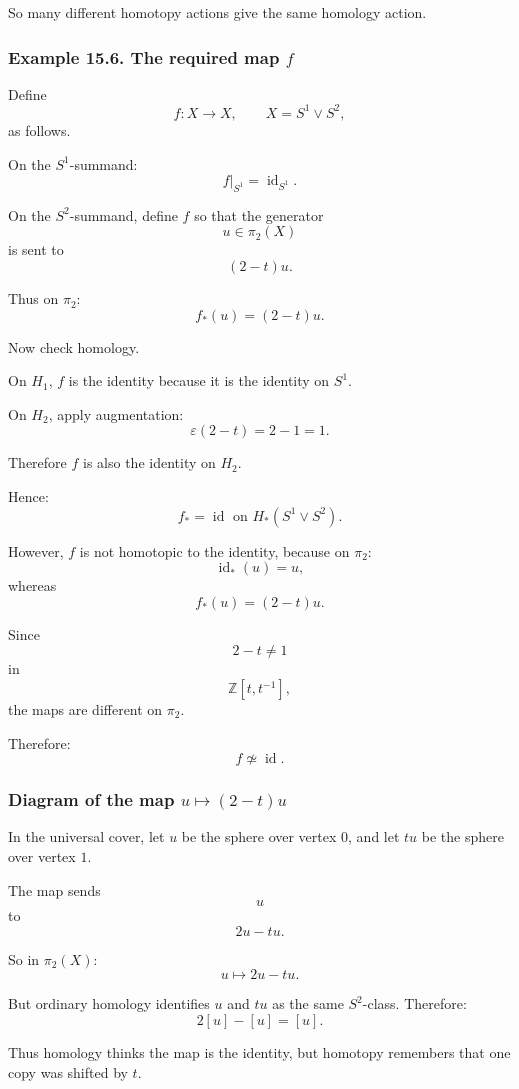 \documentclass[12pt,a4paper]{article}
\theoremstyle{notespace}
\begin{document}
So many different homotopy actions give the same homology action.

\subsubsection*{Example 15.6. The required map \(f\)}

Define
\[
f:X\to X,
\qquad
X=S^1\vee S^2,
\]
as follows.

On the \(S^1\)-summand:
\[
f|_{S^1}=\operatorname{id}_{S^1}.
\]

On the \(S^2\)-summand, define \(f\) so that the generator
\[
u\in \pi_2(X)
\]
is sent to
\[
(2-t)u.
\]

Thus on \(\pi_2\):
\[
f_*(u)=(2-t)u.
\]

Now check homology.

On \(H_1\), \(f\) is the identity because it is the identity on \(S^1\).

On \(H_2\), apply augmentation:
\[
\varepsilon(2-t)=2-1=1.
\]

Therefore \(f\) is also the identity on \(H_2\).

Hence:
\[
\boxed{
	f_*=\operatorname{id}
	\text{ on }H_*(S^1\vee S^2).
}
\]

However, \(f\) is not homotopic to the identity, because on \(\pi_2\):
\[
\operatorname{id}_*(u)=u,
\]
whereas
\[
f_*(u)=(2-t)u.
\]

Since
\[
2-t\neq 1
\]
in
\[
\mathbb Z[t,t^{-1}],
\]
the maps are different on \(\pi_2\).

Therefore:
\[
\boxed{
	f\not\simeq \operatorname{id}.
}
\]

\subsubsection*{Diagram of the map \(u\mapsto (2-t)u\)}

In the universal cover, let \(u\) be the sphere over vertex \(0\), and let \(tu\) be the sphere over vertex \(1\).

The map sends
\[
u
\]
to
\[
2u-tu.
\]

So in \(\pi_2(X)\):
\[
u\mapsto 2u-tu.
\]

But ordinary homology identifies \(u\) and \(tu\) as the same \(S^2\)-class. Therefore:
\[
2[u]-[u]=[u].
\]

Thus homology thinks the map is the identity, but homotopy remembers that one copy was shifted by \(t\).
\end{document}
